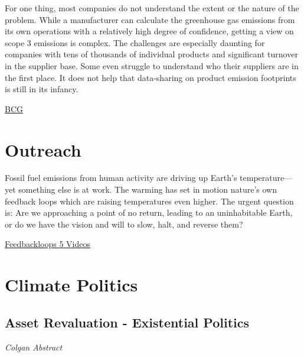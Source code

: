 \documentclass[
]{book}
\begin{document}
For one thing, most companies do not understand the extent or the nature of the problem. While a manufacturer can calculate the greenhouse gas emissions from its own operations with a relatively high degree of confidence, getting a view on scope 3 emissions is complex. The challenges are especially daunting for companies with tens of thousands of individual products and significant turnover in the supplier base. Some even struggle to understand who their suppliers are in the first place. It does not help that data-sharing on product emission footprints is still in its infancy.

\href{https://www.bcg.com/publications/2021/fighting-climate-change-with-supply-chain-decarbonization}{BCG}

\hypertarget{outreach}{%
\chapter{Outreach}\label{outreach}}

Fossil fuel emissions from human activity are driving up Earth's temperature---
yet something else is at work.
The warming has set in motion nature's own feedback loops
which are raising temperatures even higher.
The urgent question is:
Are we approaching a point of no return, leading to an uninhabitable Earth,
or do we have the vision and will to slow, halt, and reverse them?

\href{https://feedbackloopsclimate.com/introduction/}{Feedbackloops 5 Videos}

\hypertarget{climate-politics}{%
\chapter{Climate Politics}\label{climate-politics}}

\hypertarget{asset-revaluation---existential-politics}{%
\section{Asset Revaluation - Existential Politics}\label{asset-revaluation---existential-politics}}

\emph{Colgan Abstract}
\end{document}
